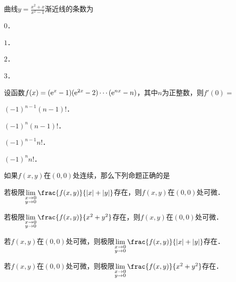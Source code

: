 \documentclass[plain,noanswer,medmath]{../../template/jnuexam}
\begin{document}




\begin{problem}
曲线$y = \frac{x^2 + x}{x^2 - 1}$渐近线的条数为\pickout{}
\begin{abcd}
\item $0$．
\item $1$．
\item $2$．
\item $3$．
\end{abcd}
\end{problem}


\begin{problem}
设函数$f(x) = (\mathrm{e}^x - 1)(\mathrm{e}^{2x} - 2) \cdots(\mathrm{e}^{nx} - n)$，其中$n$为正整数，则$f'(0) =$\pickout{}
\begin{abcd}
\item $(- 1)^{n - 1}(n - 1)!$．
\item $(- 1)^n(n - 1)!$．
\item $(- 1)^{n - 1} n!$．
\item $(- 1)^n n!$．
\end{abcd}
\end{problem}


\begin{problem}
如果$f(x,y)$在$\left(0,0 \right)$处连续，那么下列命题正确的是\pickout{}
\begin{abcd}
\item 若极限$\lim_{\begin{subarray}{l}
  x \to 0 \\
  y \to 0
\end{subarray}} \frac{f(x,y)}{|x| + |y|}$存在，则$f(x,y)$在$(0,0)$处可微．
\item 若极限$\lim_{\begin{subarray}{l}
  x \to 0 \\
  y \to 0
\end{subarray}} \frac{f(x,y)}{x^2 + y^2}$存在，则$f(x,y)$在$(0,0)$处可微．
\item 若$f(x,y)$在$(0,0)$处可微，则极限$\lim_{\begin{subarray}{l}
  x \to 0 \\
  y \to 0
\end{subarray}} \frac{f(x,y)}{|x| + |y|}$存在．
\item 若$f(x,y)$在$(0,0)$处可微，则极限$\lim_{\begin{subarray}{l}
  x \to 0 \\
  y \to 0
\end{subarray}} \frac{f(x,y)}{x^2 + y^2}$存在．
\end{abcd}
\end{problem}
\end{document}
